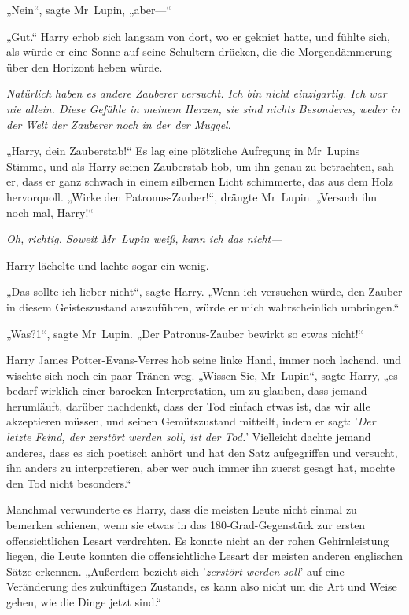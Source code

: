 {„Nein“, sagte Mr~Lupin, „aber—“

„Gut.“ Harry erhob sich langsam von dort, wo er gekniet hatte, und fühlte sich, als würde er eine Sonne auf seine Schultern drücken, die die Morgendämmerung über den Horizont heben würde.

\emph{Natürlich haben es andere Zauberer versucht. Ich bin nicht einzigartig. Ich war nie allein. Diese Gefühle in meinem Herzen, sie sind nichts Besonderes, weder in der Welt der Zauberer noch in der der Muggel}.

„Harry, dein Zauberstab!“ Es lag eine plötzliche Aufregung in Mr~Lupins Stimme, und als Harry seinen Zauberstab hob, um ihn genau zu betrachten, sah er, dass er ganz schwach in einem silbernen Licht schimmerte, das aus dem Holz hervorquoll. „Wirke den Patronus-Zauber!“, drängte Mr~Lupin. „Versuch ihn noch mal, Harry!“

\emph{Oh, richtig. Soweit Mr~Lupin weiß, kann ich das nicht—}

Harry lächelte und lachte sogar ein wenig.

„Das sollte ich lieber nicht“, sagte Harry. „Wenn ich versuchen würde, den Zauber in diesem Geisteszustand auszuführen, würde er mich wahrscheinlich umbringen.“

„Was?1“, sagte Mr~Lupin. „Der Patronus-Zauber bewirkt so etwas nicht!“

Harry James Potter-Evans-Verres hob seine linke Hand, immer noch lachend, und wischte sich noch ein paar Tränen weg. „Wissen Sie, Mr~Lupin“, sagte Harry, „es bedarf wirklich einer barocken Interpretation, um zu glauben, dass jemand herumläuft, darüber nachdenkt, dass der Tod einfach etwas ist, das wir alle akzeptieren müssen, und seinen Gemütszustand mitteilt, indem er sagt: '\emph{Der letzte Feind, der zerstört werden soll, ist der Tod.}' Vielleicht dachte jemand anderes, dass es sich poetisch anhört und hat den Satz aufgegriffen und versucht, ihn anders zu interpretieren, aber wer auch immer ihn zuerst gesagt hat, mochte den Tod nicht besonders.“

Manchmal verwunderte es Harry, dass die meisten Leute nicht einmal zu bemerken schienen, wenn sie etwas in das 180-Grad-Gegenstück zur ersten offensichtlichen Lesart verdrehten. Es konnte nicht an der rohen Gehirnleistung liegen, die Leute konnten die offensichtliche Lesart der meisten anderen englischen Sätze erkennen. „Außerdem bezieht sich '\emph{zerstört werden soll}' auf eine Veränderung des zukünftigen Zustands, es kann also nicht um die Art und Weise gehen, wie die Dinge jetzt sind.“

}
